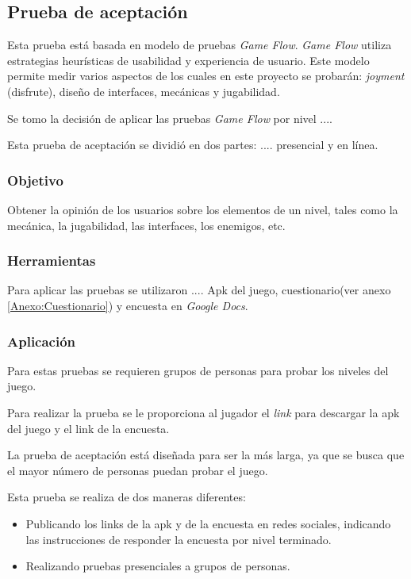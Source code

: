 \subsection{Prueba de aceptación}
Esta prueba está basada en modelo de pruebas \textit{Game Flow}\cite{gameflow}. 
\textit{Game Flow} utiliza estrategias heurísticas de usabilidad y experiencia de usuario.
Este modelo permite medir varios aspectos de los cuales en este proyecto se probarán: 
 {\it joyment} (disfrute), diseño de interfaces, mecánicas y jugabilidad. 
 
Se tomo la decisión de aplicar las pruebas \textit{Game Flow} por nivel ....
 
Esta prueba de aceptación se dividió en dos partes: .... presencial y en línea.


 
\subsubsection{Objetivo} %
Obtener la opinión de los usuarios sobre los elementos de un nivel, tales como
la mecánica, la jugabilidad, las interfaces, los enemigos, etc.

\subsubsection{Herramientas}

Para aplicar las pruebas se utilizaron .... %
Apk del juego, cuestionario(ver anexo \ref{Anexo:Cuestionario}) y encuesta en \textit{Google Docs}.

\subsubsection{Aplicación}
Para estas pruebas se requieren grupos de personas para probar los niveles del
juego.

Para realizar
la prueba se le proporciona al jugador el {\it link} para descargar la apk del juego
y el link de la encuesta. 

La prueba de aceptación está diseñada para ser la más larga, ya que
se busca que el mayor número de personas puedan probar el juego. %

Esta prueba se realiza de dos maneras diferentes:
\begin{itemize}
        \item Publicando los links de la apk y de la encuesta en redes sociales,
        indicando las instrucciones de responder la encuesta por nivel terminado.
        \item Realizando pruebas presenciales a grupos de personas.
\end{itemize}

